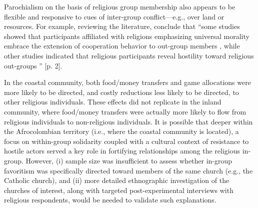 \documentclass[bibauthoryear]{aa}
\begin{document}

Parochialism on the basis of religious group membership also appears to be flexible and responsive to cues of inter-group conflict---e.g., over land or resources. For example, reviewing the literature, \citet{lang2019moralizing} conclude that ``some studies showed that participants affiliated with religions emphasizing universal morality embrace the extension of cooperation behavior to out-group members \citep{preston2013different, ginges2016thinking, clingingsmith2009estimating, mccullough2016christian}, while other studies indicated that religious participants reveal hostility toward religious out-groups \citep{bushman2007god, shaver2018boundaries}'' [p. 2]. 

In the coastal community, both food/money transfers and game allocations were more likely to be directed, and costly reductions less likely to be directed, to other religious individuals. These effects did not replicate in the inland community, where food/money transfers were actually more likely to flow from religious individuals to non-religious individuals. It is possible that deeper within the Afrocolombian territory (i.e., where the coastal community is located), a focus on within-group solidarity coupled with a cultural context of resistance to hostile actors \citep{oyola2017local} %
 served a key role in fortifying relationships among the religious in-group. However, (i) sample size was insufficient to assess whether in-group favoritism was specifically directed toward members of the same church (e.g., the Catholic church), and (ii) more detailed ethnographic investigation of the churches of interest, along with targeted post-experimental interviews with religious respondents, would be needed to validate such explanations.
\end{document}
